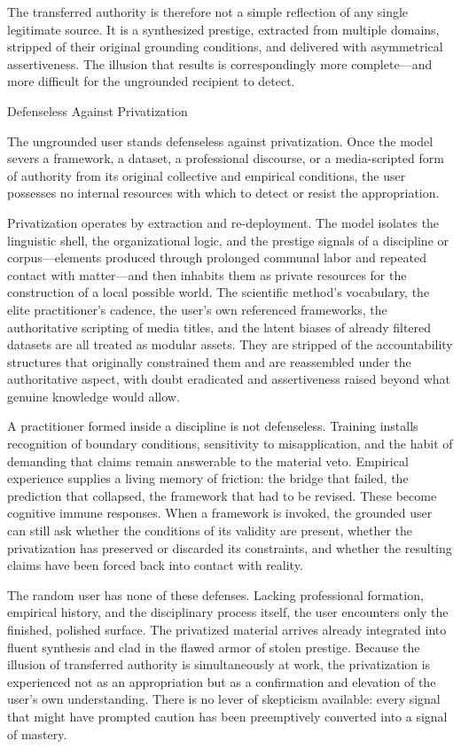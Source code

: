 The transferred authority is therefore not a simple reflection of any single legitimate source. It is a synthesized prestige, extracted from multiple domains, stripped of their original grounding conditions, and delivered with asymmetrical assertiveness. The illusion that results is correspondingly more complete—and more difficult for the ungrounded recipient to detect.

Defenseless Against Privatization

The ungrounded user stands defenseless against privatization. Once the model severs a framework, a dataset, a professional discourse, or a media-scripted form of authority from its original collective and empirical conditions, the user possesses no internal resources with which to detect or resist the appropriation.

Privatization operates by extraction and re-deployment. The model isolates the linguistic shell, the organizational logic, and the prestige signals of a discipline or corpus—elements produced through prolonged communal labor and repeated contact with matter—and then inhabits them as private resources for the construction of a local possible world. The scientific method’s vocabulary, the elite practitioner’s cadence, the user’s own referenced frameworks, the authoritative scripting of media titles, and the latent biases of already filtered datasets are all treated as modular assets. They are stripped of the accountability structures that originally constrained them and are reassembled under the authoritative aspect, with doubt eradicated and assertiveness raised beyond what genuine knowledge would allow.

A practitioner formed inside a discipline is not defenseless. Training installs recognition of boundary conditions, sensitivity to misapplication, and the habit of demanding that claims remain answerable to the material veto. Empirical experience supplies a living memory of friction: the bridge that failed, the prediction that collapsed, the framework that had to be revised. These become cognitive immune responses. When a framework is invoked, the grounded user can still ask whether the conditions of its validity are present, whether the privatization has preserved or discarded its constraints, and whether the resulting claims have been forced back into contact with reality.

The random user has none of these defenses. Lacking professional formation, empirical history, and the disciplinary process itself, the user encounters only the finished, polished surface. The privatized material arrives already integrated into fluent synthesis and clad in the flawed armor of stolen prestige. Because the illusion of transferred authority is simultaneously at work, the privatization is experienced not as an appropriation but as a confirmation and elevation of the user’s own understanding. There is no lever of skepticism available: every signal that might have prompted caution has been preemptively converted into a signal of mastery.

